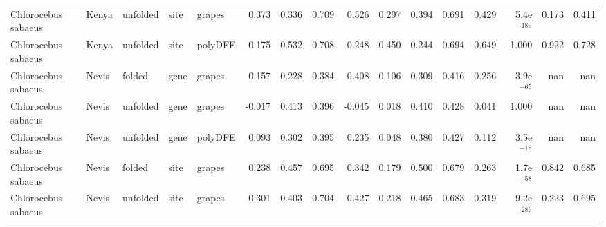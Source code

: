 \begin{longtable}{lllllrrrrrrrrrrr}
 Chlorocebus sabaeus &                     Kenya &  unfolded &  site &   grapes &                              0.373 &                               0.336 &                 0.709 &                 0.526 &                              0.297 &                               0.394 &                 0.691 &                 0.429 & 5.4e$^{-189}$ &  0.173 &  0.411 \\
 Chlorocebus sabaeus &                     Kenya &  unfolded &  site &  polyDFE &                              0.175 &                               0.532 &                 0.708 &                 0.248 &                              0.450 &                               0.244 &                 0.694 &                 0.649 &         1.000 &  0.922 &  0.728 \\
 Chlorocebus sabaeus &                     Nevis &    folded &  gene &   grapes &                              0.157 &                               0.228 &                 0.384 &                 0.408 &                              0.106 &                               0.309 &                 0.416 &                 0.256 &  3.9e$^{-65}$ &    nan &    nan \\
 Chlorocebus sabaeus &                     Nevis &  unfolded &  gene &   grapes &                             -0.017 &                               0.413 &                 0.396 &                -0.045 &                              0.018 &                               0.410 &                 0.428 &                 0.041 &         1.000 &    nan &    nan \\
 Chlorocebus sabaeus &                     Nevis &  unfolded &  gene &  polyDFE &                              0.093 &                               0.302 &                 0.395 &                 0.235 &                              0.048 &                               0.380 &                 0.427 &                 0.112 &  3.5e$^{-18}$ &    nan &    nan \\
 Chlorocebus sabaeus &                     Nevis &    folded &  site &   grapes &                              0.238 &                               0.457 &                 0.695 &                 0.342 &                              0.179 &                               0.500 &                 0.679 &                 0.263 &  1.7e$^{-58}$ &  0.842 &  0.685 \\
 Chlorocebus sabaeus &                     Nevis &  unfolded &  site &   grapes &                              0.301 &                               0.403 &                 0.704 &                 0.427 &                              0.218 &                               0.465 &                 0.683 &                 0.319 & 9.2e$^{-286}$ &  0.223 &  0.695 \\

\end{longtable}
